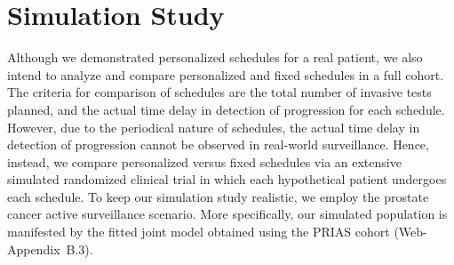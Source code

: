 \section{Simulation Study}
\label{sec:sim_study}
Although we demonstrated personalized schedules for a real patient, we also intend to analyze and compare personalized and fixed schedules in a full cohort. The criteria for comparison of schedules are the total number of invasive tests planned, and the actual time delay in detection of progression for each schedule. However, due to the periodical nature of schedules, the actual time delay in detection of progression cannot be observed in real-world surveillance. Hence, instead, we compare personalized versus fixed schedules via an extensive simulated randomized clinical trial in which each hypothetical patient undergoes each schedule. To keep our simulation study realistic, we employ the prostate cancer active surveillance scenario. More specifically, our simulated population is manifested by the fitted joint model obtained using the PRIAS cohort (Web-Appendix~B.3).


